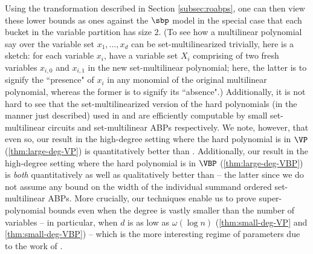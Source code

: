\documentclass{article}
\begin{document}
Using the transformation described in Section \ref{subsec:roabps}, one can then view these lower bounds as ones against the $\sbp$ model in the special case that each bucket in the variable partition has size $2$. (To see how a multilinear polynomial say over the variable set $x_1,\ldots,x_d$ can be set-multilinearized trivially, here is a sketch: for each variable $x_i$, have a variable set $X_i$ comprising of two fresh variables $x_{i,0}$ and $x_{i,1}$ in the new set-multilinear polynomial; here, the latter is to signify the ``presence" of $x_i$ in any monomial of the original multilinear polynomial, whereas the former is to signify its ``absence".)
Additionally, it is not hard to see that the set-multilinearized version of the hard polynomials (in the manner just described) used in \cite[Theorem 1]{RR20} and \cite[Theorem 2]{GR21} are efficiently computable by small set-multilinear circuits and set-multilinear ABPs respectively.
We note, however, that even so, our result in the high-degree setting where the hard polynomial is in $\VP$ (\autoref{thm:large-deg-VP}) is quantitatively better than \cite[Theorem 1]{RR20}.
Additionally, our result in the high-degree setting where the hard polynomial is in $\VBP$ (\autoref{thm:large-deg-VBP}) is \emph{both} quantitatively as well as qualitatively better than \cite[Theorem 2]{GR21} -- the latter since we do not assume any bound on the width of the individual summand ordered set-multilinear ABPs.
More crucially, %
our techniques enable us to prove super-polynomial bounds even when the degree is vastly smaller than the number of variables -- in particular, when $d$ is as low as $\omega(\log n)$ (\autoref{thm:small-deg-VP} and \autoref{thm:small-deg-VBP}) -- which is the more interesting regime of parameters due to the work of \cite{BDS23}. 
\end{document}
